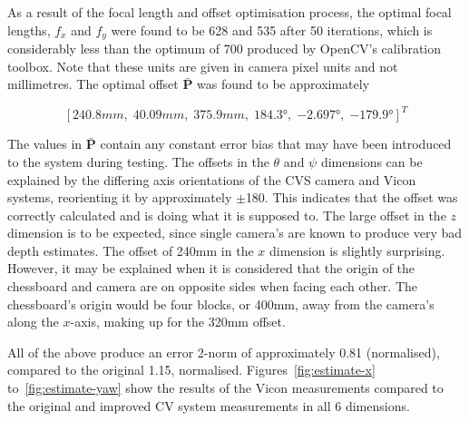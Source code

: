 As a result of the focal length and offset optimisation process, the optimal focal lengths, $f_x$ and $f_y$ were found to be 628 and 535 after 50 iterations, which is considerably less than the optimum of 700 produced by OpenCV's calibration toolbox. Note that these units are given in camera pixel units and not millimetres. The optimal offset $\bar{\bm{P}}$ was found to be approximately

\[
  [240.8mm, \; 40.09mm, \; 375.9mm, \; \ang{184.3}, \; \ang{-2.697}, \; \ang{-179.9}]^T
\]

The values in $\bar{\bm{P}}$ contain any constant error bias that may have been introduced to the system during testing. The offsets in the $\theta$ and $\psi$ dimensions can be explained by the differing axis orientations of the CVS camera and Vicon systems, reorienting it by approximately $\pm$180\degree. This indicates that the offset was correctly calculated and is doing what it is supposed to. The large offset in the $z$ dimension is to be expected, since single camera's are known to produce very bad depth estimates. The offset of 240mm in the $x$ dimension is slightly surprising. However, it may be explained when it is considered that the origin of the chessboard and camera are on opposite sides when facing each other. The chessboard's origin would be four blocks, or 400mm, away from the camera's along the $x$-axis, making up for the 320mm offset.

All of the above produce an error 2-norm of approximately 0.81 (normalised), compared to the original 1.15, normalised. Figures~\ref{fig:estimate-x} to~\ref{fig:estimate-yaw} show the results of the Vicon measurements compared to the original and improved CV system measurements in all 6 dimensions.

